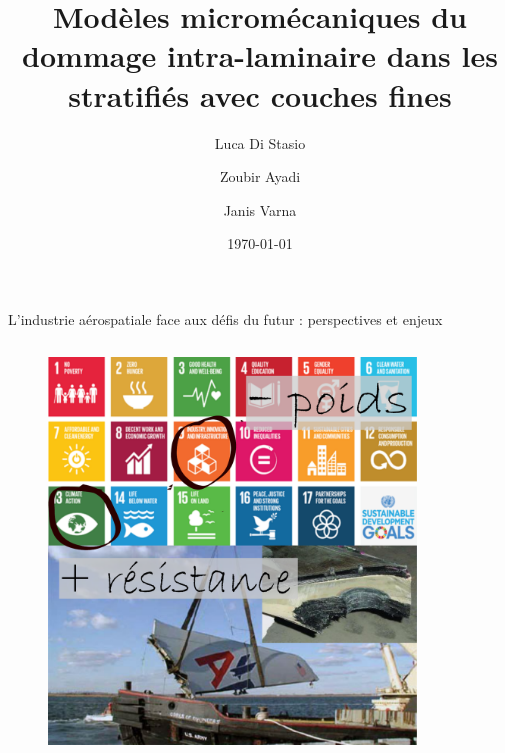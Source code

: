 \documentclass[final]{beamer}
\title{Mod\`eles microm\'ecaniques du dommage intra-laminaire dans les stratifi\'es avec couches fines}
\author{Luca Di Stasio \inst{1,2} \and Zoubir Ayadi \inst{1} \and Janis Varna \inst{2}}
\date{\today}
\begin{document}
\begin{frame}

\begin{center}
\begin{minipage}{\textwidth}
\begin{block}{\rule[-0.6ex]{0pt}{50pt}\centering\LARGE L'industrie a\'erospatiale face aux d\'efis du futur : perspectives et enjeux}
\vspace{1cm}
\begin{columns}
\begin{column}{0.375\textwidth}
  \begin{center}
\captionsetup[subfigure]{labelformat=empty}
\begin{figure}[!h]
\centering
\includegraphics[width=0.9\columnwidth]{intro.pdf}
\end{figure}
\end{center}
\end{column}
\begin{column}{0.325\textwidth}  %
  \begin{center}
\captionsetup[subfigure]{labelformat=empty}
\begin{figure}[!h]
\centering

\end{figure}
\end{center}
\end{column}
\end{columns}
\end{block}
\end{minipage}
\end{center}
\end{frame}
\end{document}
